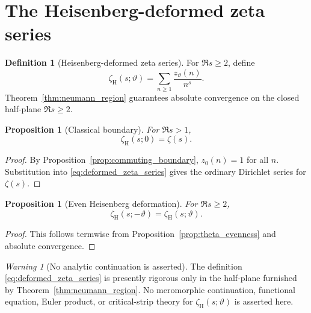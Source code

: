 \documentclass[11pt]{amsart}
\numberwithin{equation}{section}
\theoremstyle{plain}
\newtheorem{proposition}[theorem]{Proposition}
\theoremstyle{definition}
\newtheorem{definition}[theorem]{Definition}
\theoremstyle{remark}
\newtheorem{warning}[theorem]{Warning}
\begin{document}
\section{The Heisenberg-deformed zeta series}
\label{sec:deformed_zeta_series}

\begin{definition}[Heisenberg-deformed zeta series]
\label{def:deformed_zeta_series}
For $\Re s\ge2$, define
\begin{equation}
\zeta_{\mathrm H}(s;\vartheta)
=
\sum_{n\ge1}\frac{z_{\vartheta}(n)}{n^s}.
\label{eq:deformed_zeta_series}
\end{equation}
Theorem~\ref{thm:neumann_region} guarantees absolute convergence on the
closed half-plane $\Re s\ge2$.
\end{definition}

\begin{proposition}[Classical boundary]
\label{prop:zeta_classical_boundary}
For $\Re s>1$,
\begin{equation}
\zeta_{\mathrm H}(s;0)=\zeta(s).
\label{eq:zeta_classical_boundary}
\end{equation}
\end{proposition}

\begin{proof}
By Proposition~\ref{prop:commuting_boundary}, $z_0(n)=1$ for all $n$.
Substitution into \eqref{eq:deformed_zeta_series} gives the ordinary
Dirichlet series for $\zeta(s)$.
\end{proof}

\begin{proposition}[Even Heisenberg deformation]
\label{prop:zeta_theta_even}
For $\Re s\ge2$,
\begin{equation}
\zeta_{\mathrm H}(s;-\vartheta)
=
\zeta_{\mathrm H}(s;\vartheta).
\label{eq:zeta_theta_even}
\end{equation}
\end{proposition}

\begin{proof}
This follows termwise from Proposition~\ref{prop:theta_evenness} and absolute
convergence.
\end{proof}

\begin{warning}[No analytic continuation is asserted]
\label{warn:no_continuation}
The definition \eqref{eq:deformed_zeta_series} is presently rigorous only in
the half-plane furnished by Theorem~\ref{thm:neumann_region}.  No meromorphic
continuation, functional equation, Euler product, or critical-strip theory
for $\zeta_{\mathrm H}(s;\vartheta)$ is asserted here.
\end{warning}
\end{document}
